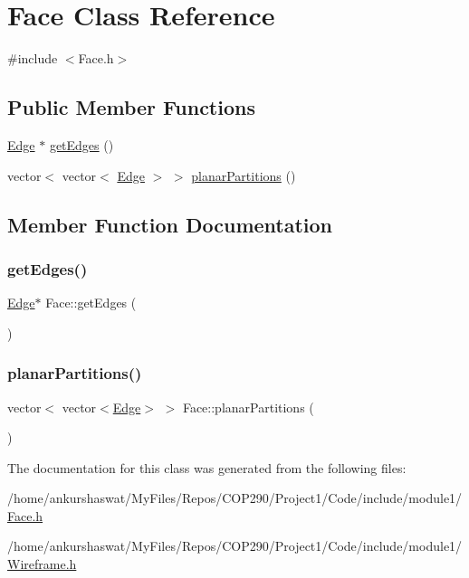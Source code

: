 \hypertarget{classFace}{}\section{Face Class Reference}
\label{classFace}


{\ttfamily \#include $<$Face.\+h$>$}

\subsection*{Public Member Functions}
\begin{DoxyCompactItemize}
\item 
\hyperlink{classEdge}{Edge} $\ast$ \hyperlink{classFace_a5973ddd3395e60aeadc76f24d1bcc860}{get\+Edges} ()
\item 
vector$<$ vector$<$ \hyperlink{classEdge}{Edge} $>$ $>$ \hyperlink{classFace_a3676c176d0ad0b518a74409372aa94da}{planar\+Partitions} ()
\end{DoxyCompactItemize}


\subsection{Member Function Documentation}
\mbox{\label{classFace_a5973ddd3395e60aeadc76f24d1bcc860}} 
\subsubsection{\texorpdfstring{get\+Edges()}{getEdges()}}
{\footnotesize\ttfamily \hyperlink{classEdge}{Edge}$\ast$ Face\+::get\+Edges (\begin{DoxyParamCaption}{ }\end{DoxyParamCaption})}

\mbox{\label{classFace_a3676c176d0ad0b518a74409372aa94da}} 
\subsubsection{\texorpdfstring{planar\+Partitions()}{planarPartitions()}}
{\footnotesize\ttfamily vector$<$ vector$<$\hyperlink{classEdge}{Edge}$>$ $>$ Face\+::planar\+Partitions (\begin{DoxyParamCaption}{ }\end{DoxyParamCaption})}



The documentation for this class was generated from the following files\+:\begin{DoxyCompactItemize}
\item 
/home/ankurshaswat/\+My\+Files/\+Repos/\+C\+O\+P290/\+Project1/\+Code/include/module1/\hyperlink{Face_8h}{Face.\+h}\item 
/home/ankurshaswat/\+My\+Files/\+Repos/\+C\+O\+P290/\+Project1/\+Code/include/module1/\hyperlink{Wireframe_8h}{Wireframe.\+h}\end{DoxyCompactItemize}
